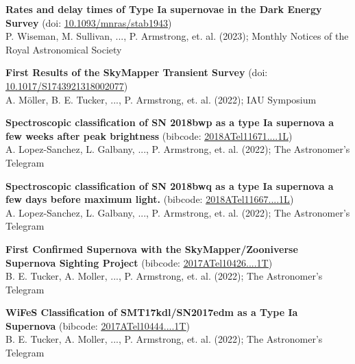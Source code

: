 \documentclass[letterpaper,11pt]{article}
\newcommand*\lbreak{\\[\baselineskip]}
\newcommand{\publicationElement}[5]{%
    \textbf{{#1}} ({#4})\\{#3}; {#2}\lbreak{}
}
\begin{document}
        \publicationElement{Rates and delay times of Type Ia supernovae in the Dark Energy Survey}{Monthly Notices of the Royal Astronomical Society}{P. Wiseman, M. Sullivan, ..., P. Armstrong, et. al. (2023)}{doi: \href{https://doi.org/10.1093/mnras/stab1943}{\underline{10.1093/mnras/stab1943}}}{}
        \publicationElement{First Results of the SkyMapper Transient Survey}{IAU Symposium}{A. Möller, B. E. Tucker, ..., P. Armstrong, et. al. (2022)}{doi: \href{https://doi.org/10.1017/S1743921318002077}{\underline{10.1017/S1743921318002077}}}{}
        \publicationElement{Spectroscopic classification of SN 2018bwp as a type Ia supernova a few weeks after peak brightness}{The Astronomer's Telegram}{A. Lopez-Sanchez, L. Galbany, ..., P. Armstrong, et. al. (2022)}{bibcode: \href{https://ui.adsabs.harvard.edu/abs/2018ATel11671....1L/abstract}{\underline{2018ATel11671....1L}}}{}
        \publicationElement{Spectroscopic classification of SN 2018bwq as a type Ia supernova a few days before maximum light.}{The Astronomer's Telegram}{A. Lopez-Sanchez, L. Galbany, ..., P. Armstrong, et. al. (2022)}{bibcode: \href{https://ui.adsabs.harvard.edu/abs/2018ATel11667....1L/abstract}{\underline{2018ATel11667....1L}}}{}
        \publicationElement{First Confirmed Supernova with the SkyMapper/Zooniverse Supernova Sighting Project}{The Astronomer's Telegram}{B. E. Tucker, A. Moller, ..., P. Armstrong, et. al. (2022)}{bibcode: \href{https://ui.adsabs.harvard.edu/abs/2017ATel10426....1T/abstract}{\underline{2017ATel10426....1T}}}{}
        \publicationElement{WiFeS Classification of SMT17kdl/SN2017edm as a Type Ia Supernova}{The Astronomer's Telegram}{B. E. Tucker, A. Moller, ..., P. Armstrong, et. al. (2022)}{bibcode: \href{https://ui.adsabs.harvard.edu/abs/2017ATel10444....1T/abstract}{\underline{2017ATel10444....1T}}}{}
\end{document}
